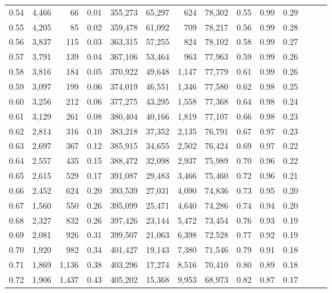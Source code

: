 \begin{tabular}{rrrrrrrrrrrrrr}
0.54 &  4,466 &     66 &  0.01 &  355,273 &   65,297 &     624 &  78,302 &  0.55 &  0.99 &      0.29 \\
0.55 &  4,205 &     85 &  0.02 &  359,478 &   61,092 &     709 &  78,217 &  0.56 &  0.99 &      0.28 \\
0.56 &  3,837 &    115 &  0.03 &  363,315 &   57,255 &     824 &  78,102 &  0.58 &  0.99 &      0.27 \\
0.57 &  3,791 &    139 &  0.04 &  367,106 &   53,464 &     963 &  77,963 &  0.59 &  0.99 &      0.26 \\
0.58 &  3,816 &    184 &  0.05 &  370,922 &   49,648 &   1,147 &  77,779 &  0.61 &  0.99 &      0.26 \\
0.59 &  3,097 &    199 &  0.06 &  374,019 &   46,551 &   1,346 &  77,580 &  0.62 &  0.98 &      0.25 \\
0.60 &  3,256 &    212 &  0.06 &  377,275 &   43,295 &   1,558 &  77,368 &  0.64 &  0.98 &      0.24 \\
0.61 &  3,129 &    261 &  0.08 &  380,404 &   40,166 &   1,819 &  77,107 &  0.66 &  0.98 &      0.23 \\
0.62 &  2,814 &    316 &  0.10 &  383,218 &   37,352 &   2,135 &  76,791 &  0.67 &  0.97 &      0.23 \\
0.63 &  2,697 &    367 &  0.12 &  385,915 &   34,655 &   2,502 &  76,424 &  0.69 &  0.97 &      0.22 \\
0.64 &  2,557 &    435 &  0.15 &  388,472 &   32,098 &   2,937 &  75,989 &  0.70 &  0.96 &      0.22 \\
0.65 &  2,615 &    529 &  0.17 &  391,087 &   29,483 &   3,466 &  75,460 &  0.72 &  0.96 &      0.21 \\
0.66 &  2,452 &    624 &  0.20 &  393,539 &   27,031 &   4,090 &  74,836 &  0.73 &  0.95 &      0.20 \\
0.67 &  1,560 &    550 &  0.26 &  395,099 &   25,471 &   4,640 &  74,286 &  0.74 &  0.94 &      0.20 \\
0.68 &  2,327 &    832 &  0.26 &  397,426 &   23,144 &   5,472 &  73,454 &  0.76 &  0.93 &      0.19 \\
0.69 &  2,081 &    926 &  0.31 &  399,507 &   21,063 &   6,398 &  72,528 &  0.77 &  0.92 &      0.19 \\
0.70 &  1,920 &    982 &  0.34 &  401,427 &   19,143 &   7,380 &  71,546 &  0.79 &  0.91 &      0.18 \\
0.71 &  1,869 &  1,136 &  0.38 &  403,296 &   17,274 &   8,516 &  70,410 &  0.80 &  0.89 &      0.18 \\
0.72 &  1,906 &  1,437 &  0.43 &  405,202 &   15,368 &   9,953 &  68,973 &  0.82 &  0.87 &      0.17 \\

\end{tabular}
